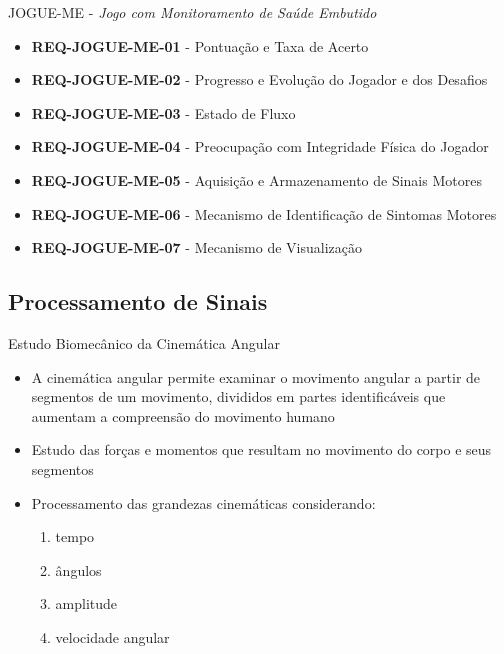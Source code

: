 \documentclass{beamer}
\begin{document}
\begin{frame}{JOGUE-ME - \textit{Jogo com Monitoramento de Saúde Embutido}}
	\begin{block}{}
		\begin{itemize}
			\item	\textbf{REQ-JOGUE-ME-01} - Pontuação e Taxa de Acerto
			\item	\textbf{REQ-JOGUE-ME-02} - Progresso e Evolução do Jogador e dos Desafios
			\item	\textbf{REQ-JOGUE-ME-03} - Estado de Fluxo
			\item	\textbf{REQ-JOGUE-ME-04} - Preocupação com Integridade Física do Jogador
			\item	\textbf{REQ-JOGUE-ME-05} - Aquisição e Armazenamento de Sinais Motores
			\item	\textbf{REQ-JOGUE-ME-06} - Mecanismo de Identificação de Sintomas Motores
			\item	\textbf{REQ-JOGUE-ME-07} - Mecanismo de Visualização
		\end{itemize}
	\end{block}
\end{frame}

\subsection{Processamento de Sinais}


\begin{frame}{Estudo Biomecânico da Cinemática Angular}
  \begin{block}{}
      \begin{itemize}
	 \item A cinemática angular permite examinar o movimento angular a partir de segmentos de um movimento, divididos em partes identificáveis que aumentam a compreensão do movimento humano  
	 \item Estudo das forças e momentos que resultam no movimento do corpo e seus segmentos
	 \item Processamento das grandezas cinemáticas considerando: 
	    \begin{enumerate}
	      \item tempo
	      \item ângulos
	      \item amplitude
	      \item velocidade angular
	    \end{enumerate}
       \end{itemize}
  \end{block}
\end{frame}
\end{document}

